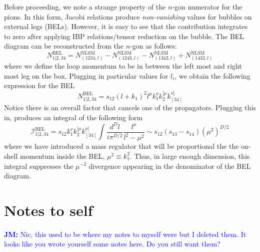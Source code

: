 \documentclass[11pt,letter]{article}
\newcommand{\jm}[1]{\textcolor{blue}{\textbf{JM: }{#1}}}
\begin{document}
Before proceeding, we note a strange property of the $n$-gon numerator for the pions. In this form, Jacobi relations produce \textit{non-vanishing} values for bubbles on external legs (BELs). However, it is easy to see that the contribution integrates to zero after applying IBP relations/tensor reduction on the bubble. The BEL diagram can be reconstructed from the $n$-gon as follows:
\begin{equation}
N^{\text{BEL}}_{1|2,34} = N^{\text{NLSM}}_{(1234,l)}-N^{\text{NLSM}}_{(1243,l)}-N^{\text{NLSM}}_{(1342,l)}+N^{\text{NLSM}}_{(1432,l)}
\end{equation}
where we define the loop momentum to be in between the left most and right most leg on the box. Plugging in particular values for $l_i$, we obtain the following expression for the BEL
\begin{equation}
N^{\text{BEL}}_{1|2,34} = s_{12} (l+k_1)^2 l^{\mu} k_1^{\nu} k_2^{[\mu} k_{[34]}^{\nu]} 
\end{equation}
Notice there is an overall factor that cancels one of the propagators. Plugging this in, produces an integral of the following form
\begin{equation}
\mathcal{I}^{\text{BEL}}_{1|2,34} = s_{12} k_1^{\nu} k_2^{[\mu} k_{[34]}^{\nu]} \int \frac{d^D l}{i\pi^{D/2}} \frac{l^\mu }{l^2-\mu^2} \sim   s_{12}(s_{13}-s_{14}) (\mu^2)^{D/2}
\end{equation}
where we have introduced a mass regulator that will be proportional the the on-shell momentum inside the BEL, $\mu^2 \equiv k_1^2$. Thus, in large enough dimension, this integral suppresses the $\mu^{-2}$ divergence appearing in the denominator of the BEL diagram. 

\section{Notes to self}
\jm{Nic, this used to be where my notes to myself were but I deleted them.  It looks like you wrote yourself some notes here.  Do you still want them?}
\end{document}
